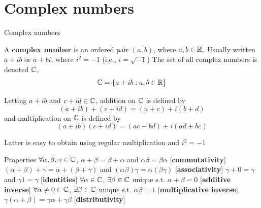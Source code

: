 \documentclass[aspectratio=169]{beamer}
\begin{document}

\section{Complex numbers}

\begin{frame}{Complex numbers}
	\begin{definition}
		A \textbf{complex number} is an ordered pair $(a,b)$, where $a,b\in\mathbb{R}$. Usually written $a+ib$ or $a+bi$, where $i^2=-1$ (i.e., $i=\sqrt{-1}$)
		\vfill
		The set of all complex numbers is denoted $\mathbb{C}$, 
		\[
		\mathbb{C}=\{a+ib: a,b\in\mathbb{R}\}
		\]
	\end{definition}
\end{frame}

\begin{frame}
	\begin{definition}
		Letting $a+ib$ and $c+id\in\mathbb{C}$, addition on $\mathbb{C}$ is defined by
		\[
		(a+ib)+(c+id) = (a+c)+i(b+d)
		\]
		and multiplication on $\mathbb{C}$ is defined by
		\[
		(a+ib)(c+id) = (ac-bd)+i(ad+bc)
		\]
	\end{definition}
	\vfill
	Latter is easy to obtain using regular multiplication and $i^2=-1$
\end{frame}

\begin{frame}{Properties}
	$\forall\alpha,\beta,\gamma\in\mathbb{C}$,
	\vfill
	$\alpha+\beta=\beta+\alpha$ and $\alpha\beta=\beta\alpha$ \hfill[\textbf{commutativity}]
	\vfill
	$(\alpha+\beta)+\gamma=\alpha+(\beta+\gamma)$ and $(\alpha\beta)\gamma=\alpha(\beta\gamma)$ \hfill[\textbf{associativity}]
	\vfill
	$\gamma+0=\gamma$ and $\gamma 1=\gamma$ \hfill[\textbf{identities}]
	\vfill
	$\forall\alpha\in\mathbb{C}$, $\exists\beta\in\mathbb{C}$ unique s.t. $\alpha+\beta=0$ \hfill[\textbf{additive inverse}]
	\vfill
	$\forall \alpha\neq 0\in\mathbb{C}$, $\exists\beta\in\mathbb{C}$ unique s.t. $\alpha\beta=1$ \hfill[\textbf{multiplicative inverse}]
	\vfill
	$\gamma(\alpha+\beta)=\gamma\alpha+\gamma\beta$ \hfill[\textbf{distributivity}]
\end{frame}
\end{document}
